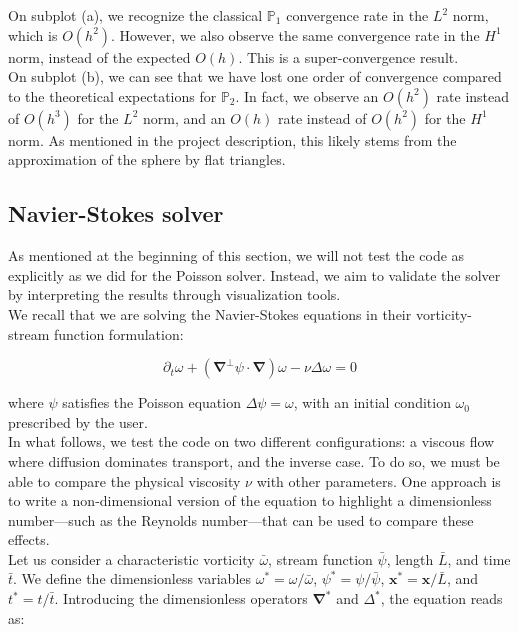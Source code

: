 \documentclass{article}
\theoremstyle{definition}
\theoremstyle{proposition}
\theoremstyle{theorem}
\theoremstyle{remark}
\theoremstyle{corollary}  %
\theoremstyle{exercise}
\theoremstyle{lemma}
\begin{document}
On subplot (a), we recognize the classical $\mathbb{P}_1$ convergence rate in the $L^2$ norm, which is $O(h^2)$. However, we also observe the same convergence rate in the $H^1$ norm, instead of the expected $O(h)$. This is a super-convergence result. \\

On subplot (b), we can see that we have lost one order of convergence compared to the theoretical expectations for $\mathbb{P}_2$. In fact, we observe an $O(h^2)$ rate instead of $O(h^3)$ for the $L^2$ norm, and an $O(h)$ rate instead of $O(h^2)$ for the $H^1$ norm. As mentioned in the project description, this likely stems from the approximation of the sphere by flat triangles.


\subsection{Navier-Stokes solver}

As mentioned at the beginning of this section, we will not test the code as explicitly as we did for the Poisson solver. Instead, we aim to validate the solver by interpreting the results through visualization tools. \\

We recall that we are solving the Navier-Stokes equations in their vorticity-stream function formulation:

$$\partial_t \omega + (\bm \nabla ^{\perp} \psi \cdot \bm \nabla)\omega - \nu \Delta \omega = 0$$

where $\psi$ satisfies the Poisson equation $\Delta \psi = \omega$, with an initial condition $\omega_0$ prescribed by the user. \\

In what follows, we test the code on two different configurations: a viscous flow where diffusion dominates transport, and the inverse case. To do so, we must be able to compare the physical viscosity $\nu$ with other parameters. One approach is to write a non-dimensional version of the equation to highlight a dimensionless number—such as the Reynolds number—that can be used to compare these effects. \\

Let us consider a characteristic vorticity $\bar{\omega}$, stream function $\bar{\psi}$, length $\bar{L}$, and time $\bar{t}$. We define the dimensionless variables $\omega^* = \omega / \bar{\omega}$, $\psi^* = \psi / \bar{\psi}$, $\bm{x}^* = \bm{x} / \bar{L}$, and $t^* = t / \bar{t}$. Introducing the dimensionless operators $\bm{\nabla}^*$ and $\Delta^*$, the equation reads as:
\end{document}
